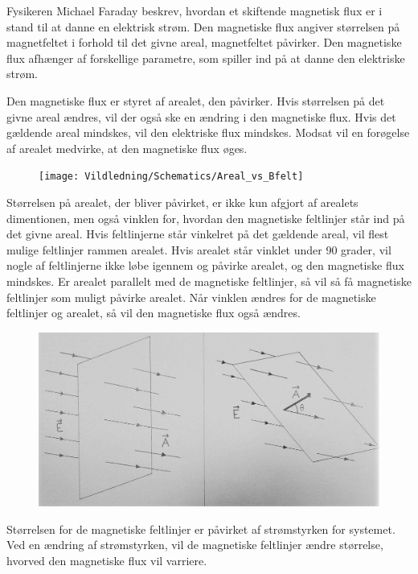 Fysikeren Michael Faraday beskrev, hvordan et skiftende magnetisk flux er i stand til at danne en elektrisk strøm. Den magnetiske flux angiver størrelsen på magnetfeltet i forhold til det givne areal, magnetfeltet påvirker. Den magnetiske flux afhænger af forskellige parametre, som spiller ind på at danne den elektriske strøm.

Den magnetiske flux er styret af arealet, den påvirker. Hvis størrelsen på det givne areal ændres, vil der også ske en ændring i den magnetiske flux. Hvis det gældende areal mindskes, vil den elektriske flux mindskes. Modsat vil en forøgelse af arealet medvirke, at den magnetiske flux øges.

\begin{figure}[H]
\texttt{[image: Vildledning/Schematics/Areal\_vs\_Bfelt]}
\end{figure}

Størrelsen på arealet, der bliver påvirket, er ikke kun afgjort af arealets dimentionen, men også vinklen for, hvordan den magnetiske feltlinjer står ind på det givne areal. Hvis feltlinjerne står vinkelret på det gældende areal, vil flest mulige feltlinjer rammen arealet. Hvis arealet står vinklet under 90 grader, vil nogle af feltlinjerne ikke løbe igennem og påvirke arealet, og den magnetiske flux mindskes. Er arealet parallelt med de magnetiske feltlinjer, så vil så få magnetiske feltlinjer som muligt påvirke arealet. Når vinklen ændres for de magnetiske feltlinjer og arealet, så vil den magnetiske flux også ændres.

\begin{figure}[H]
\includegraphics[scale=0,5]{Vildledning/Schematics/Vinkelflux}
\end{figure}

Størrelsen for de magnetiske feltlinjer er påvirket af strømstyrken for systemet. Ved en ændring af strømstyrken, vil de magnetiske feltlinjer ændre størrelse, hvorved den magnetiske flux vil varriere.